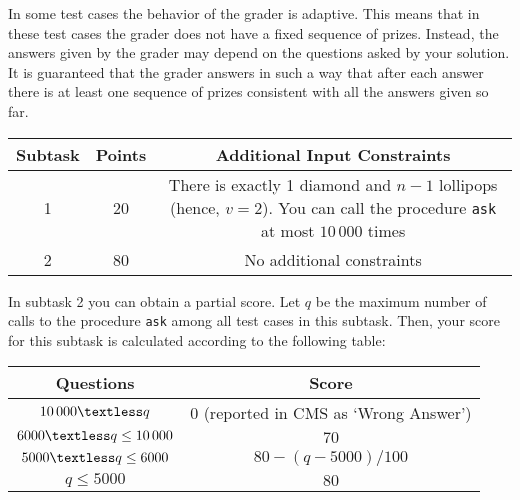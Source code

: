 In some test cases the behavior of the grader is adaptive. This means that in these test cases the grader does not have a fixed sequence of prizes. Instead, the answers given by the grader may depend on the questions asked by your solution. It is guaranteed that the grader answers in such a way that after each answer there is at least one sequence of prizes consistent with all the answers given so far.

\begin{center}
\renewcommand{\arraystretch}{1.5}
\begin{tabular}{|c|c|c|}
\hline
Subtask & Points & Additional Input Constraints\\
\hline
1 &  20 & \parbox{13cm}{\centering \vspace{2mm}There is exactly 1 diamond and $n - 1$ lollipops (hence, $v = 2$).
You can call the procedure \texttt{ask} at most $10\,000$ times \\\vspace{2mm}} \\
 & 80 & No additional constraints \\
\hline
\end{tabular}
\end{center}

In subtask 2 you can obtain a partial score. Let $q$ be the maximum number of calls to the procedure \texttt{ask} among all test cases in this subtask. Then, your score for this subtask is calculated according to the following table:

\newcommand{\lt}{\textless}

\begin{center}
\renewcommand{\arraystretch}{1.5}
\begin{tabular}{|c|c|}
\hline
Questions & Score \\
\hline
$10\,000 \lt q$ & $0$ (reported in CMS as `Wrong Answer') \\
\hline
$6000 \lt q \leq 10\,000$ & $70$ \\
\hline
$5000 \lt q \leq 6000$ & $80 - (q-5000)/100$ \\
\hline
$q \leq 5000$ & $80$ \\
\hline
\end{tabular}
\end{center}


